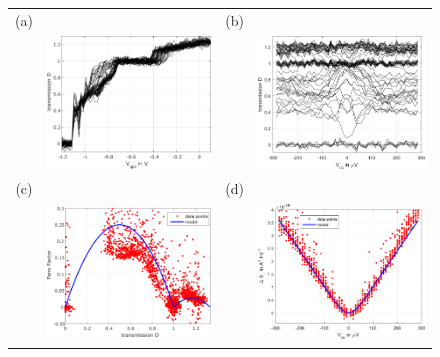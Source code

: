\begin{figure}[hptb]
	\begin{center}
		\begin{tabular}{c c c c}
			(a) & & (b) & \\
			& \includegraphics[width = 6.5 cm]{./chap2/nu_4_3_D_vs_Vqpc_for_several_Vdc} &
			& \includegraphics[width = 6.5 cm]{./chap2/nu_4_3_D_vs_Vdc_for_several_Vqpc} \\
			(c) & & (d) & \\
			& \includegraphics[width = 6.5 cm]{./chap2/nu_4_3_noise_vs_D_for_several_Vdc} &
			& \includegraphics[width = 6.5 cm]{./chap2/nu_4_3_noise_vs_Vdc_for_D_1_15_1_3}
		\end{tabular}
	\end{center}
	

\end{figure}
